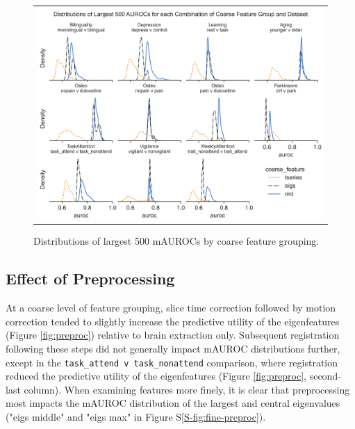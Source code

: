 \documentclass[12pt]{spieman}  %
\newcommand{\code}[1]{\small\texttt{#1}\normalsize}
\begin{document}
\begin{spacing}{2}
\begin{figure}
\begin{center}
\begin{tabular}{c}
\includegraphics[width=6.5in]{coarse_feature_largest_by_subgroup.png}
\end{tabular}
\end{center}
\caption
{ \label{fig:largest} Distributions of largest 500 mAUROCs by coarse feature grouping.}
\end{figure}

\subsection{Effect of Preprocessing}
At a coarse level of feature grouping, slice time correction followed by motion
correction tended to slightly increase the predictive utility of the
eigenfeatures (Figure \ref{fig:preproc}) relative to brain extraction only.
Subsequent registration following these steps did not generally impact mAUROC
distributions further, except in the \code{task\_attend v task\_nonattend}
comparison, where registration reduced the predictive utility of the
eigenfeatures (Figure \ref{fig:preproc}, second-last column). When examining
features more finely, it is clear that preprocessing most impacts the mAUROC
distribution of the largest and central eigenvalues ("eigs middle" and "eigs
max" in Figure S\ref{S-fig:fine-preproc}).



\end{spacing}
\end{document}
